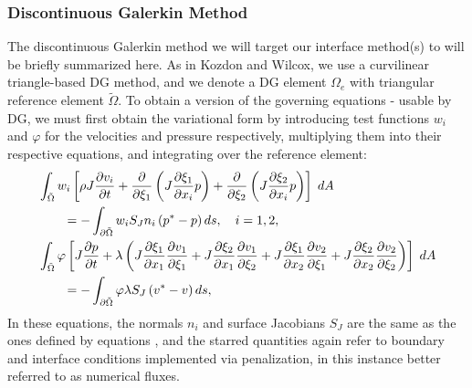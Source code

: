 \subsubsection{Discontinuous Galerkin Method}

The discontinuous Galerkin method we will target our interface method(s) to
will be briefly summarized here. As in Kozdon and Wilcox, we use a curvilinear
triangle-based DG method, and we denote a DG element $\Omega_e$ with triangular
reference element $\tilde{\Omega}$. To obtain a version of the governing equations
 -  usable by DG, we must first obtain the variational
form by introducing test functions $w_{i}$ and $\varphi$ for the velocities and pressure
respectively, multiplying them into their respective equations, and integrating over
the reference element:
\begin{align}
  \notag
  &\int_{\tilde{\Omega}} w_{i}\left[\rho J \frac{\partial v_{i}}{\partial t}
  + \frac{\partial}{\partial \xi_{1}}\left(J\frac{\partial \xi_{1}}{\partial x_{i}} p\right)
  + \frac{\partial}{\partial \xi_{2}}\left(J\frac{\partial \xi_{2}}{\partial x_{i}} p\right)\right]\;dA\\
  \label{eq:wave1_var}
  &\qquad=
  -\int_{\partial \tilde{\Omega}} w_{i} S_{J} n_{i} \left( p^* - p\right)ds,
  \quad i=1,2,\\
  \notag
  &\int_{\tilde{\Omega}}
  \varphi \left[J\frac{\partial p}{\partial t} + \lambda\left(
    J\frac{\partial \xi_{1}}{\partial x_{1}} \frac{\partial v_{1}}{\partial \xi_{1}}
  + J\frac{\partial \xi_{2}}{\partial x_{1}} \frac{\partial v_{1}}{\partial \xi_{2}}
  + J\frac{\partial \xi_{1}}{\partial x_{2}} \frac{\partial v_{2}}{\partial \xi_{1}}
  + J\frac{\partial \xi_{2}}{\partial x_{2}} \frac{\partial v_{2}}{\partial \xi_{2}}\right)\right]\;dA\\
  \label{eq:wave2_var}
  &\qquad=
  -\int_{\partial \tilde{\Omega}} \varphi\lambda S_{J}
  \left(v^*-v\right) ds,
\end{align}
In these equations, the normals $n_{i}$ and surface Jacobians $S_{J}$ are the same
as the ones defined by equations , and the starred
quantities again refer to boundary and interface conditions implemented via penalization,
in this instance better referred to as numerical fluxes.
